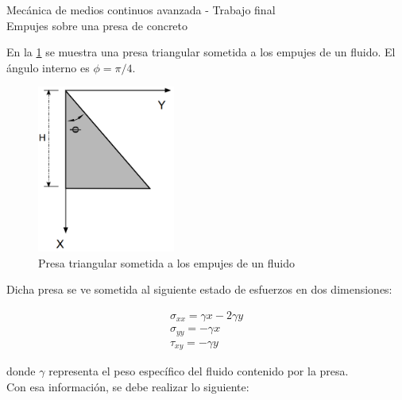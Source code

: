 \documentclass{exam}
\begin{document}
\pagestyle{empty}


\begin{center}
	{\huge Mecánica de medios continuos avanzada - Trabajo final }\\
	
	{\Large Empujes sobre una presa de concreto}
\end{center}

En la \cref{presa} se muestra una presa triangular sometida a los empujes de un fluido. El ángulo interno es $\phi = \pi/4$.

\begin{figure}[H]
	\centering
	\includegraphics[height=5.5cm]{images/presa.PNG}
	\caption{Presa triangular sometida a los empujes de un fluido}
	\label{presa}
\end{figure}

Dicha presa se ve sometida al siguiente estado de esfuerzos en dos dimensiones:

\begin{eqnarray*}
\sigma_{xx} = \gamma x - 2 \gamma y \\
\sigma_{yy} = - \gamma x \\
\tau_{xy} = - \gamma y
\end{eqnarray*}

donde $\gamma$ representa el peso específico del fluido contenido por la presa. \\

Con esa información, se debe realizar lo siguiente:
\end{document}
